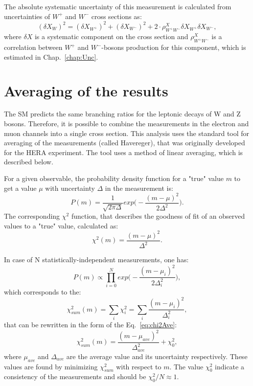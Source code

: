 The absolute systematic uncertainty of this measurement is calculated from uncertainties of $W^{+}$ and $W^{-}$ cross sections as:
\begin{equation}
(\delta X_{W})^2 = (\delta X_{W^{+}})^2+(\delta X_{W^{-}})^2 + 2\cdot \rho^{X}_{W^+W^-}\delta X_{W^{+}}\delta X_{W^{-}},
\end{equation}
where $\delta X$ is a systematic component on the cross section and $\rho^{X}_{W^+W^-}$ is a correlation between $W^{+}$ and $W^{-}$-bosons production for this component, which is estimated in Chap.~\ref{chap:Unc}. 

\section{Averaging of the results}\label{sec:Aver}

The SM predicts the same branching ratios for the leptonic decays of W and Z bosons. Therefore, it is possible to combine the measurements in the electron and muon channels into a single cross section. This analysis uses the standard tool for averaging of the measurements (called Havereger), that was originally developed  for the HERA experiment\cite{HERADIS}. The tool uses a method of linear averaging, which is described below.

For a given observable, the probability density function for a "true" value $m$ to get a value $\mu$ with uncertainty $\Delta$ in the measurement is:
\begin{equation}
P(m)=\frac{1}{\sqrt{2\pi\Delta}}exp\Big(-\frac{(m-\mu)^2}{2\Delta^2}\Big).
\end{equation}
 The corresponding $\chi^2$ function, that describes the goodness of fit of an observed values to a "true" value, calculated as:
\begin{equation}\label{eq:chi2Ave}
\chi^2(m) = \frac{(m-\mu)^2}{\Delta^2}.
\end{equation}

In case of N statistically-independent measurements, one has:
\begin{equation}
P(m)\propto \prod_{i=0}^{N} exp\Big(-\frac{(m-\mu_i)^2}{2\Delta_i^2}\Big),
\end{equation}
which corresponds to the:
\begin{equation}
\chi_{sum}^2(m) = \sum_{i} \chi^2_i = \sum_{i} \frac{(m-\mu_i)^2}{\Delta_i^2}, 
\end{equation}
that can be rewritten in the form of the Eq.~\ref{eq:chi2Ave}:
\begin{equation}\label{eq:chi2Sum}
\chi_{sum}^2(m) =\frac{(m-\mu_{ave})^2}{\Delta_{ave}^2}+\chi^{2}_{0}, 
\end{equation}
where $\mu_{ave}$ and $\Delta_{ave}$ are the average value and its uncertainty respectively.  These values are found by minimizing $\chi^{2}_{sum}$ with respect to $m$.  The value $\chi^2_0$ indicate a consistency of the measurements and should be $\chi^2_0/N \approx 1$.

